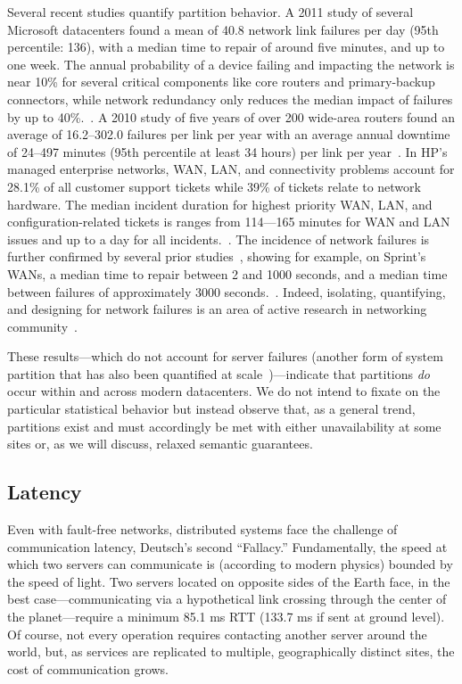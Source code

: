 Several recent studies quantify partition behavior. A 2011 study of
several Microsoft datacenters found a mean of 40.8 network link
failures per day (95th percentile: 136), with a median time to repair
of around five minutes, and up to one week. The annual probability of
a device failing and impacting the network is near 10\% for several
critical components like core routers and primary-backup connectors,
while network redundancy only reduces the median impact of failures by
up to 40\%.~\cite{sigcomm-dc}. A 2010 study of five years of over 200
wide-area routers found an average of 16.2--302.0 failures per link
per year with an average annual downtime of 24--497 minutes (95th
percentile at least 34 hours) per link per year~\cite{sigcomm-wan}. In
HP's managed enterprise networks, WAN, LAN, and connectivity problems
account for 28.1\% of all customer support tickets while 39\% of
tickets relate to network hardware.  The median incident duration for
highest priority WAN, LAN, and configuration-related tickets is ranges
from 114---165 minutes for WAN and LAN issues and up to a day for all
incidents.~\cite{turner2012failure}. The incidence of network failures
is further confirmed by several prior
studies~\cite{labovitz-failures}, showing for example, on Sprint's
WANs, a median time to repair between 2 and 1000 seconds, and a median
time between failures of approximately 3000
seconds.~\cite{ip-backbone-failures}. Indeed, isolating, quantifying,
and designing for network failures is an area of active research in
networking community~\cite{surviving-failures-bodik,
  uw-failure-networks}.

These results---which do not account for server failures (another form
of system partition that has also been quantified at
scale~\cite{google-availability})---indicate that partitions
\textit{do} occur within and across modern datacenters. We do not
intend to fixate on the particular statistical behavior but instead
observe that, as a general trend, partitions exist and must
accordingly be met with either unavailability at some sites or, as we
will discuss, relaxed semantic guarantees.

\subsection{Latency}

Even with fault-free networks, distributed systems face the challenge
of communication latency, Deutsch's second ``Fallacy.'' Fundamentally,
the speed at which two servers can communicate is (according to modern
physics) bounded by the speed of light. Two servers located on
opposite sides of the Earth face, in the best case---communicating via
a hypothetical link crossing through the center of the
planet---require a minimum 85.1 ms RTT (133.7 ms if sent at ground
level). Of course, not every operation requires contacting another
server around the world, but, as services are replicated to multiple,
geographically distinct sites, the cost of communication grows.

